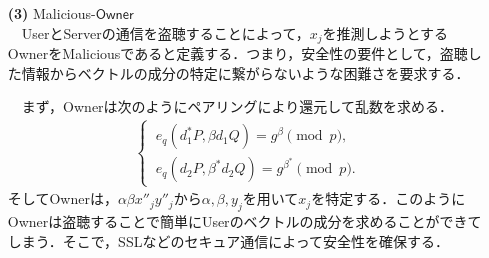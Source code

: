 \documentclass[a4paper]{jsarticle}
\newcommand{\user}{\textsf{User}}
\newcommand{\server}{\textsf{Server}}
\newcommand{\owner}{\textsf{Owner}}
\begin{document}
\begin{enumerate}
\begin{figure}[!h]
  \begin{center}
   \texttt{[image: system.003.jpeg]}
  \end{center}
  \caption{Security Game}
  \label{Game1} %
\end{figure}

　検索クエリ$Q_x$や参照データベース$D_y$は，乱数$\alpha, \alpha^*,\beta,\beta^*$を用いて生成する．これらの乱数は$Q_x,D_y$を生成する度に生成するため，\textsf{Adversary}はこの乱数を$Q_x,D_y$から特定することができなければ，$Q_x,D_y$を多く集めても識別することは不可能である．しかし，前述のとおり\textsf{Server}は，乱数を特定することはできない．また，双対直交基底も乱数を用いて生成しているので，\owner から$\mathsf{msk}$についての情報が漏れない限り，\textsf{Server}は\textsf{msk}を特定することはできない．したがって，$Q_x,D_y$からベクトルの成分を特定するための部分情報は一切漏れない．

\ \ \ \ 



\item[\textbf{(3)}] Malicious-$\mathsf{Owner}$\\
　\user と\server の通信を盗聴することによって，$x_j$を推測しようとする\owner をMaliciousであると定義する．つまり，安全性の要件として，盗聴した情報からベクトルの成分の特定に繋がらないような困難さを要求する．

　まず，\owner は次のようにペアリングにより還元して乱数を求める．
\begin{align}
\begin{cases}
\ e_q(d_1^*P,\beta d_1 Q) = g^{\beta}\pmod{p},\\
\ e_q(d_2 P,\beta^* d_2 Q) = g^{\beta^*}\pmod{p}.
\end{cases}
\end{align}
そして\owner は，$\alpha\beta x''_j y''_j$から$\alpha, \beta, y_j$を用いて$x_j$を特定する．このように\owner は盗聴することで簡単に\user のベクトルの成分を求めることができてしまう．そこで，SSLなどのセキュア通信によって安全性を確保する．
\end{enumerate}





\vspace{-0.1in}
\end{document}
